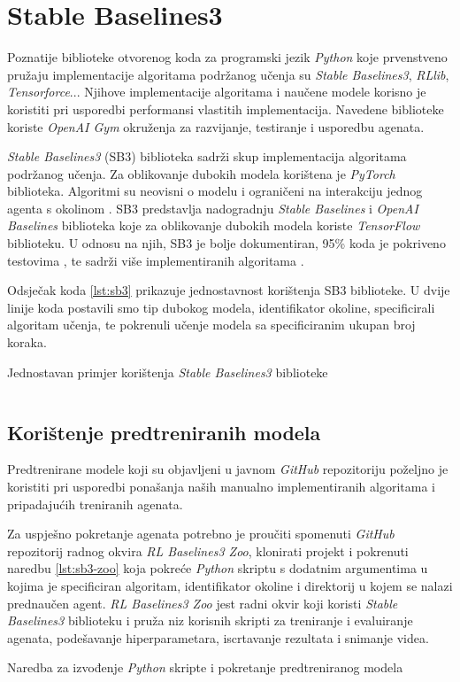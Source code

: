 \chapter{Stable Baselines3}

Poznatije biblioteke otvorenog koda za programski jezik \textit{Python} koje prvenstveno pružaju implementacije algoritama podržanog učenja su \textit{Stable Baselines3}, \textit{RLlib}, \textit{Tensorforce}... Njihove implementacije algoritama i naučene modele korisno je koristiti pri usporedbi performansi vlastitih implementacija. Navedene biblioteke koriste \textit{OpenAI Gym} okruženja za razvijanje, testiranje i usporedbu agenata.

\textit{Stable Baselines3} (SB3) biblioteka sadrži skup implementacija algoritama podržanog učenja. Za oblikovanje dubokih modela korištena je \textit{PyTorch} biblioteka. Algoritmi su neovisni o modelu  i ograničeni na interakciju jednog agenta s okolinom . SB3 predstavlja nadogradnju \textit{Stable Baselines} i \textit{OpenAI Baselines} biblioteka koje za oblikovanje dubokih modela koriste \textit{TensorFlow} biblioteku. U odnosu na njih, SB3 je bolje dokumentiran, 95\% koda je pokriveno testovima , te sadrži više implementiranih algoritama \cite{SB3}. 

Odsječak koda \ref{lst:sb3} prikazuje jednostavnost korištenja SB3 biblioteke. U dvije linije koda postavili smo tip dubokog modela, identifikator okoline, specificirali algoritam učenja, te pokrenuli učenje modela sa specificiranim ukupan broj koraka.

\begin{listing}[H]
    \caption{Jednostavan primjer korištenja \textit{Stable Baselines3} biblioteke}
    \inputminted{python}{snippets/sb3.py}
    \label{lst:sb3}
\end{listing}

\section{Korištenje predtreniranih modela}

Predtrenirane modele koji su objavljeni u javnom \textit{GitHub} repozitoriju \cite{sb3-alg-repo} poželjno je koristiti pri usporedbi ponašanja naših manualno implementiranih algoritama i pripadajućih treniranih agenata.

Za uspješno pokretanje agenata potrebno je proučiti spomenuti \textit{GitHub} repozitorij radnog okvira \textit{RL Baselines3 Zoo}, klonirati projekt i pokrenuti naredbu \ref{lst:sb3-zoo} koja pokreće \textit{Python} skriptu s dodatnim argumentima u kojima je specificiran algoritam, identifikator okoline i direktorij u kojem se nalazi prednaučen agent. \textit{RL Baselines3 Zoo} jest radni okvir koji koristi \textit{Stable Baselines3} biblioteku i pruža niz korisnih skripti za treniranje i evaluiranje agenata, podešavanje hiperparametara, iscrtavanje rezultata i snimanje videa.

\begin{listing}[H]
    \caption{Naredba za izvođenje \textit{Python} skripte i pokretanje predtreniranog modela}
    \inputminted{powershell}{snippets/sb3-zoo.txt}
    \label{lst:sb3-zoo}
\end{listing}
